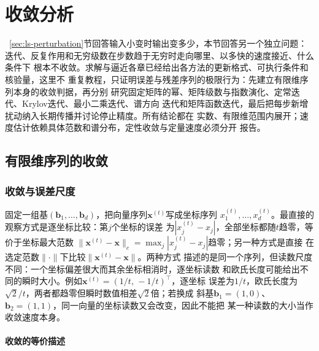 \section{收敛分析}
\label{sec:ls-convergence}
\label{sec:linear-algebra-convergence-approximation}

~\ref{sec:ls-perturbation}节回答输入小变时输出变多少，本节回答另一个独立问题：
迭代、反复作用和无穷级数在步数趋于无穷时走向哪里、以多快的速度接近、什么条件下
根本不收敛。求解与逼近各章已经给出各方法的更新格式、可执行条件和核验量，这里不
重复教程，只证明误差与残差序列的极限行为：先建立有限维序列本身的收敛判据，再分别
研究固定矩阵的幂、矩阵级数与指数演化、定常迭代、Krylov迭代、最小二乘迭代、谱方向
迭代和矩阵函数迭代，最后把每步新增扰动纳入长期传播并讨论停止精度。所有结论都在
实数、有限维范围内展开；速度估计依赖具体范数和谱分布，定性收敛与定量速度必须分开
报告。

\subsection{有限维序列的收敛}
\label{sec:ls-finite-dimensional-sequences}
\label{sec:linear-algebra-sequence-convergence}

\subsubsection{收敛与误差尺度}

固定一组基$(\bm b_1,\ldots,\bm b_d)$，把向量序列$\bm x^{(t)}$写成坐标序列
$x_1^{(t)},\ldots,x_d^{(t)}$。最直接的观察方式是逐坐标比较：第$j$个坐标的误差
为$|x_j^{(t)}-x_j|$，全部坐标都随$t$趋零，等价于坐标最大范数
$\lVert\bm x^{(t)}-\bm x\rVert_c=\max_j|x_j^{(t)}-x_j|$趋零；另一种方式是直接
在选定范数$\lVert\cdot\rVert$下比较$\lVert\bm x^{(t)}-\bm x\rVert$。两种方式
描述的是同一个序列，但读数尺度不同：一个坐标偏差很大而其余坐标相消时，逐坐标读数
和欧氏长度可能给出不同的瞬时大小。例如$\bm x^{(t)}=(1/t,\,-1/t)^{\top}$，逐坐标
误差为$1/t$，欧氏长度为$\sqrt2/t$，两者都趋零但瞬时数值相差$\sqrt2$倍；若换成
斜基$\bm b_1=(1,0)$、$\bm b_2=(1,1)$，同一向量的坐标读数又会改变，因此不能把
某一种读数的大小当作收敛速度本身。

\paragraph{收敛的等价描述}

